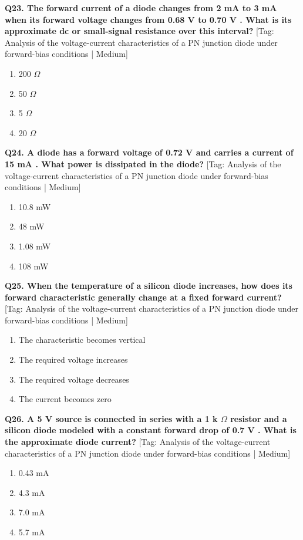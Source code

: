 \noindent\textbf{Q23. The forward current of a diode changes from 2 mA to 3 mA when its forward voltage changes from 0.68 V to 0.70 V . What is its approximate dc or small-signal resistance over this interval?} \hfill [Tag: Analysis of the voltage-current characteristics of a PN junction diode under forward-bias conditions | Medium]
\begin{enumerate}[label=(\alph*),topsep=2pt,itemsep=1pt,partopsep=0pt,parsep=0pt]
    \item {200 $\Omega$}
    \item {50 $\Omega$}
    \item {5 $\Omega$}
    \item {20 $\Omega$}
\end{enumerate}
\vspace{2mm}

\noindent\textbf{Q24. A diode has a forward voltage of 0.72 V and carries a current of 15 mA . What power is dissipated in the diode?} \hfill [Tag: Analysis of the voltage-current characteristics of a PN junction diode under forward-bias conditions | Medium]
\begin{enumerate}[label=(\alph*),topsep=2pt,itemsep=1pt,partopsep=0pt,parsep=0pt]
    \item {10.8 mW}
    \item {48 mW}
    \item {1.08 mW}
    \item {108 mW}
\end{enumerate}
\vspace{2mm}

\noindent\textbf{Q25. When the temperature of a silicon diode increases, how does its forward characteristic generally change at a fixed forward current?} \hfill [Tag: Analysis of the voltage-current characteristics of a PN junction diode under forward-bias conditions | Medium]
\begin{enumerate}[label=(\alph*),topsep=2pt,itemsep=1pt,partopsep=0pt,parsep=0pt]
    \item {The characteristic becomes vertical}
    \item {The required voltage increases}
    \item {The required voltage decreases}
    \item {The current becomes zero}
\end{enumerate}
\vspace{2mm}

\noindent\textbf{Q26. A 5 V source is connected in series with a 1 k $\Omega$ resistor and a silicon diode modeled with a constant forward drop of 0.7 V . What is the approximate diode current?} \hfill [Tag: Analysis of the voltage-current characteristics of a PN junction diode under forward-bias conditions | Medium]
\begin{enumerate}[label=(\alph*),topsep=2pt,itemsep=1pt,partopsep=0pt,parsep=0pt]
    \item {0.43 mA}
    \item {4.3 mA}
    \item {7.0 mA}
    \item {5.7 mA}
\end{enumerate}
\vspace{2mm}

